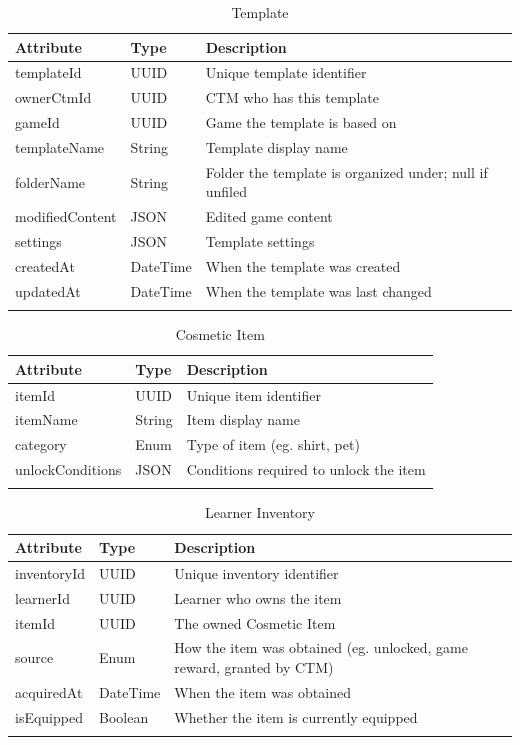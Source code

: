 \documentclass[12pt]{article}
\begin{document}
\begin{longtable}{p{} p{} p{}}
\toprule
Attribute & Type & Description\\
\midrule
templateId & UUID & Unique template identifier\\
ownerCtmId & UUID & CTM who has this template\\
gameId & UUID & Game the template is based on\\
templateName & String & Template display name\\
folderName & String & Folder the template is organized under; null if unfiled\\
modifiedContent & JSON & Edited game content\\
settings & JSON & Template settings\\
createdAt & DateTime & When the template was created\\
updatedAt & DateTime & When the template was last changed\\
\bottomrule
\caption{Template} \label{tab:Template}
\end{longtable}

\begin{longtable}{p{} p{} p{}}
\toprule
Attribute & Type & Description\\
\midrule
itemId & UUID & Unique item identifier\\
itemName & String & Item display name\\
category & Enum & Type of item (eg. shirt, pet)\\
unlockConditions & JSON & Conditions required to unlock the item\\
\bottomrule
\caption{Cosmetic Item} \label{tab:CosmeticItem}
\end{longtable}

\begin{longtable}{p{} p{} p{}}
\toprule
Attribute & Type & Description\\
\midrule
inventoryId & UUID & Unique inventory identifier\\
learnerId & UUID & Learner who owns the item\\
itemId & UUID & The owned Cosmetic Item\\
source & Enum & How the item was obtained (eg. unlocked, game reward, granted by CTM)\\
acquiredAt & DateTime & When the item was obtained\\
isEquipped & Boolean & Whether the item is currently equipped\\
\bottomrule
\caption{Learner Inventory} \label{tab:LearnerInventory}
\end{longtable}
\end{document}
